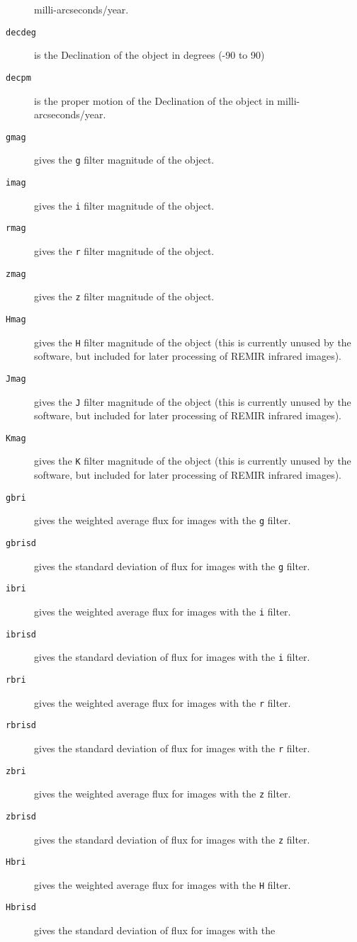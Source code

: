 \begin{description}
milli-arcseconds/year.
\item[\tt decdeg] is the Declination of the object in degrees (-90 to 90)
\item[\tt decpm] is the proper motion of the Declination of the object in
milli-arcseconds/year.
\item[\tt gmag] gives the \texttt{g} filter magnitude of the object.
\item[\tt imag] gives the \texttt{i} filter magnitude of the object.
\item[\tt rmag] gives the \texttt{r} filter magnitude of the object.
\item[\tt zmag] gives the \texttt{z} filter magnitude of the object.
\item[\tt Hmag] gives the \texttt{H} filter magnitude of the object (this is
currently unused by the software, but included for later processing of REMIR
infrared images).
\item[\tt Jmag] gives the \texttt{J} filter magnitude of the object (this is
currently unused by the software, but included for later processing of REMIR
infrared images).
\item[\tt Kmag] gives the \texttt{K} filter magnitude of the object (this is
currently unused by the software, but included for later processing of REMIR
infrared images).
\item[\tt gbri] gives the weighted average flux for images with the \texttt{g}
filter.
\item[\tt gbrisd] gives the standard deviation of flux for images with the
\texttt{g} filter.
\item[\tt ibri] gives the weighted average flux for images with the \texttt{i}
filter.
\item[\tt ibrisd] gives the standard deviation of flux for images with the
\texttt{i} filter.
\item[\tt rbri] gives the weighted average flux for images with the \texttt{r}
filter.
\item[\tt rbrisd] gives the standard deviation of flux for images with the
\texttt{r} filter.
\item[\tt zbri] gives the weighted average flux for images with the \texttt{z}
filter.
\item[\tt zbrisd] gives the standard deviation of flux for images with the
\texttt{z} filter.
\item[\tt Hbri] gives the weighted average flux for images with the \texttt{H}
filter.
\item[\tt Hbrisd] gives the standard deviation of flux for images with the

\end{description}
